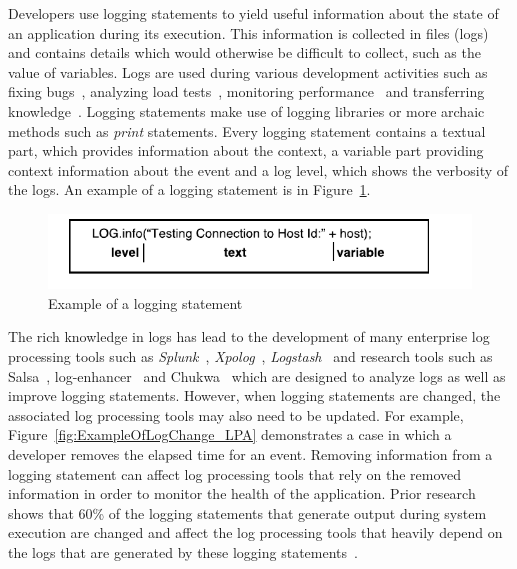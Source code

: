 

Developers use logging statements to yield useful information about the state of an application during its execution. This information is collected in files (logs) and contains details  which would otherwise be difficult to collect, such as the value of variables. Logs are used during various development activities such as fixing bugs~\cite{ConsoleLogs,JGLouMining,QFuanomaly}, analyzing load tests~\cite{Automatic}, monitoring performance~\cite{Yuan} and transferring knowledge~\cite{IanWCRE}.
Logging statements make use of logging libraries or more archaic methods such as \textsl{print} statements. Every logging statement contains a textual part, which provides information about the context, a variable part providing context information about the event and a log level, which shows the verbosity of the logs. An example of a logging statement is in Figure~\ref{fig:logexample}.

\begin{figure}[thb]
	\centering
	\includegraphics[width=1\columnwidth]{logexample}
	\caption{Example of a logging statement}
	\label{fig:logexample}
\end{figure}




The rich knowledge in logs has lead to the development of many enterprise log processing tools such as \textsl{Splunk}~\cite{carasso2012exploring}, \textsl{Xpolog}~\cite{xpolog}, \textsl{Logstash}~\cite{xu2013detecting} and research tools such as Salsa~\cite{TanSalsa}, log-enhancer~\cite{Yuan} and Chukwa~\cite{chukwa} which are designed to analyze logs as well as improve logging statements. However, when logging statements are changed, the associated log processing tools may also need to be updated. For example, Figure~\ref{fig:ExampleOfLogChange_LPA} demonstrates a case in which a developer removes the elapsed time for an event. Removing information from a logging statement can affect log processing tools that rely on the removed information in order to monitor the health of the application. Prior research shows that 60\% of the logging statements that generate output during system execution are changed and affect the log processing tools that heavily depend on the logs that are generated by these logging statements~\cite{IanWCRE}.

